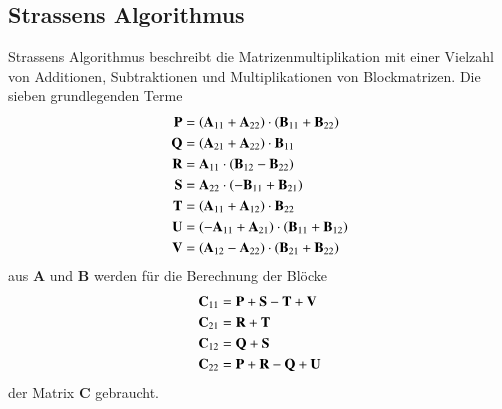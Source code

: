 \subsection{Strassens Algorithmus}

Strassens Algorithmus \cite{multiplikation:strassen_1969} beschreibt die Matrizenmultiplikation mit einer Vielzahl von Additionen, Subtraktionen und Multiplikationen von Blockmatrizen.
Die sieben grundlegenden Terme
\begin{equation} \label{multiplikation:eq:strassen}
\begin{split}
\text{\textbf{P}}   &= \left(\mathbf{A}_{11} + \mathbf{A}_{22}\right ) \cdot \left(\mathbf{B}_{11} + \mathbf{B}_{22}\right ) \\
\text{\textbf{Q}}  &= \left(\mathbf{A}_{21} + \mathbf{A}_{22}\right ) \cdot \mathbf{B}_{11} \\
\text{\textbf{R}} &= \mathbf{A}_{11} \cdot \left(\mathbf{B}_{12}-\mathbf{B}_{22}\right ) \\
\text{\textbf{S}}  &= \mathbf{A}_{22} \cdot \left(-\mathbf{B}_{11}+\mathbf{B}_{21}\right ) \\
\text{\textbf{T}}   &= \left(\mathbf{A}_{11} + \mathbf{A}_{12}\right ) \cdot \mathbf{B}_{22} \\
\text{\textbf{U}}  &= \left(-\mathbf{A}_{11} + \mathbf{A}_{21}\right ) \cdot \left(\mathbf{B}_{11} + \mathbf{B}_{12}\right ) \\
\text{\textbf{V}} &= \left(\mathbf{A}_{12} - \mathbf{A}_{22}\right ) \cdot \left(\mathbf{B}_{21} + \mathbf{B}_{22}\right )
\end{split}
\end{equation}
aus $\mathbf{A}$ und $\mathbf{B}$ werden f\"ur die Berechnung der Bl\"ocke
\begin{equation} \label{multiplikation:eq:strassen2}
\begin{split}
\mathbf{C}_{11} &= \text{\textbf{P}} + \text{\textbf{S}} - \text{\textbf{T}} + \text{\textbf{V}} \\
\mathbf{C}_{21} &= \text{\textbf{R}} + \text{\textbf{T}} \\
\mathbf{C}_{12} &= \text{\textbf{Q}} + \text{\textbf{S}}\\
\mathbf{C}_{22} &= \text{\textbf{P}} + \text{\textbf{R}} - \text{\textbf{Q}} + \text{\textbf{U}}
\end{split}
\end{equation}
der Matrix $\mathbf{C}$ gebraucht.
